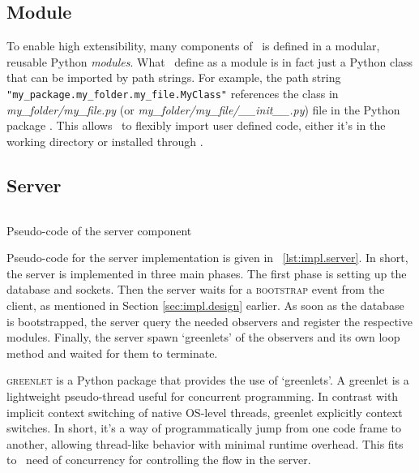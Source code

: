 \subsection{Module}

To enable high extensibility, many components of \OurBenchmarkingTool~is defined in a modular, reusable Python \emph{modules}.
What \first~define as a module is in fact just a Python class that can be imported by path strings.
For example, the path string \texttt{"my_package.my_folder.my_file.MyClass"} references the class  in \emph{my\_folder/my\_file.py} (or \emph{my\_folder/my\_file/\_\_init\_\_.py}) file in the Python package .
This allows \OurBenchmarkingTool~to flexibly import user defined code, either it's in the working directory or installed through .


\subsection{Server}

\begin{listing}
    \inputminted{python}{assets/listings/pseudocodes/server.py}
    \caption{Pseudo-code of the server component}
    \label{lst:impl.server}
\end{listing}

Pseudo-code for the server implementation is given in \lst~\ref{lst:impl.server}.
In short, the server is implemented in three main phases.
The first phase is setting up the database and sockets.
Then the server waits for a \textsc{bootstrap} event from the client, as mentioned in Section \ref{sec:impl.design} earlier.
As soon as the database is bootstrapped, the server query the needed observers and register the respective modules.
Finally, the server spawn `greenlets' of the observers and its own loop method and waited for them to terminate.

\textsc{greenlet} is a Python package that provides the use of `greenlets'.
A greenlet is a lightweight pseudo-thread useful for concurrent programming.
In contrast with implicit context switching of native OS-level threads, greenlet explicitly context switches.
In short, it's a way of programmatically jump from one code frame to another, allowing thread-like behavior with minimal runtime overhead.
This fits to \firstposs~need of concurrency for controlling the flow in the server.

